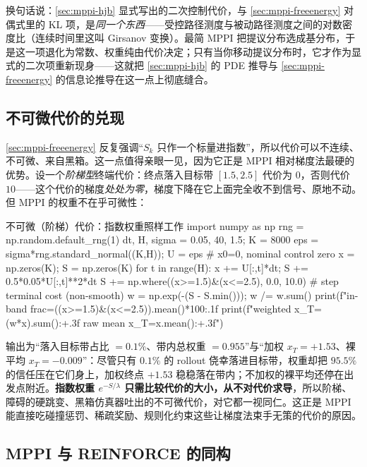 \noindent 换句话说：\cref{sec:mppi-hjb} 显式写出的二次控制代价，与 \cref{sec:mppi-freeenergy} 对偶式里的 KL 项，是\emph{同一个东西}——受控路径测度与被动路径测度之间的对数密度比（连续时间里这叫 Girsanov 变换）。最简 MPPI 把提议分布选成基分布，于是这一项退化为常数、权重纯由代价决定；只有当你移动提议分布时，它才作为显式的二次项重新现身——这就把 \cref{sec:mppi-hjb} 的 PDE 推导与 \cref{sec:mppi-freeenergy} 的信息论推导在这一点上彻底缝合。

\subsection{不可微代价的兑现}
\label{sec:mppi-nondiff}

\cref{sec:mppi-freeenergy} 反复强调“$S_k$ 只作一个标量进指数”，所以代价可以不连续、不可微、来自黑箱。这一点值得亲眼一见，因为它正是 MPPI 相对梯度法最硬的优势。设一个\emph{阶梯型}终端代价：终点落入目标带 $[1.5,2.5]$ 代价为 $0$，否则代价 $10$——这个代价的梯度\emph{处处为零}，梯度下降在它上面完全收不到信号、原地不动。但 MPPI 的权重不在乎可微性：

\begin{codebox}[Python]{不可微（阶梯）代价：指数权重照样工作}
import numpy as np
rng = np.random.default_rng(1)
dt, H, sigma = 0.05, 40, 1.5; K = 8000
eps = sigma*rng.standard_normal((K,H)); U = eps          # x0=0, nominal control zero
x = np.zeros(K); S = np.zeros(K)
for t in range(H):
    x += U[:,t]*dt; S += 0.5*0.05*U[:,t]**2*dt
S += np.where((x>=1.5)&(x<=2.5), 0.0, 10.0)              # step terminal cost (non-smooth)
w = np.exp(-(S - S.min())); w /= w.sum()
print(f"in-band frac={((x>=1.5)&(x<=2.5)).mean()*100:.1f}%
print(f"weighted x_T={(w*x).sum():+.3f}   raw mean x_T={x.mean():+.3f}")
\end{codebox}

\noindent 输出为“落入目标带占比 $=0.1\%$、带内总权重 $=0.955$”与“加权 $x_T=+1.53$、裸平均 $x_T=-0.009$”：尽管只有 $0.1\%$ 的 rollout 侥幸落进目标带，权重却把 $95.5\%$ 的信任压在它们身上，加权终点 $+1.53$ 稳稳落在带内；不加权的裸平均还停在出发点附近。\textbf{指数权重 $e^{-S/\lambda}$ 只需比较代价的大小，从不对代价求导}，所以阶梯、障碍的硬跳变、黑箱仿真器吐出的不可微代价，对它都一视同仁。这正是 MPPI 能直接吃碰撞惩罚、稀疏奖励、规则化约束这些让梯度法束手无策的代价的原因。

\subsection{MPPI 与 REINFORCE 的同构}
\label{sec:mppi-reinforce}

